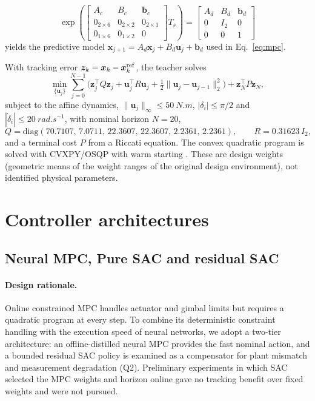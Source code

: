 \documentclass[preprint,12pt,authoryear=false]{elsarticle}
\theoremstyle{remark}\newtheorem{remark}{Remark}
\theoremstyle{plain}\newtheorem{proposition}{Proposition}\newtheorem{lemma}{Lemma}
\theoremstyle{definition}\newtheorem{assumption}{Assumption}
\begin{document}
\begin{equation}
\exp\!\left(\begin{bmatrix}A_c&B_c&\bm b_c\\0_{2\times6}&0_{2\times2}&0_{2\times1}\\0_{1\times6}&0_{1\times2}&0\end{bmatrix}T_s\right)=\begin{bmatrix}A_d&B_d&\bm b_d\\0&I_2&0\\0&0&1\end{bmatrix}
\end{equation}
yields the predictive model $\bm x_{j+1}=A_d\bm x_j+B_d\bm u_j+\bm b_d$ used in Eq.~\eqref{eq:mpc}.

With tracking error $\bm z_k=\bm x_k-\bm x_k^{\rm ref}$, the teacher solves
\begin{equation}
\min_{\{\bm u_j\}}\sum_{j=0}^{N-1}\Big(\bm z_j^\top Q\bm z_j+\bm u_j^\top R\bm u_j+\tfrac12\|\bm u_j-\bm u_{j-1}\|_2^2\Big)+\bm z_N^\top P\bm z_N,\label{eq:mpc}
\end{equation}
subject to the affine dynamics, $\|\bm u_j\|_\infty\le\SI{50}{N.m}$, $|\delta_i|\le\pi/2$ and $|\dot\delta_i|\le\SI{20}{rad.s^{-1}}$, with nominal horizon $N=20$,
\begin{equation}
Q=\mathrm{diag}(70.7107,\,7.0711,\,22.3607,\,22.3607,\,2.2361,\,2.2361),\qquad R=0.31623\,I_2,
\end{equation}
and a terminal cost $P$ from a Riccati equation. The convex quadratic program is solved with CVXPY/OSQP with warm starting \cite{stellato2020osqp}. These are design weights (geometric means of the weight ranges of the original design environment), not identified physical parameters.

\section{Controller architectures}
\subsection{Neural MPC, Pure SAC and residual SAC}\label{sec:nn}
\paragraph{Design rationale.}
Online constrained MPC handles actuator and gimbal limits but requires a quadratic program at every step. To combine its deterministic constraint handling with the execution speed of neural networks, we adopt a two-tier architecture: an offline-distilled neural MPC provides the fast nominal action, and a bounded residual SAC policy is examined as a compensator for plant mismatch and measurement degradation (Q2). Preliminary experiments in which SAC selected the MPC weights and horizon online gave no tracking benefit over fixed weights and were not pursued.
\end{document}
